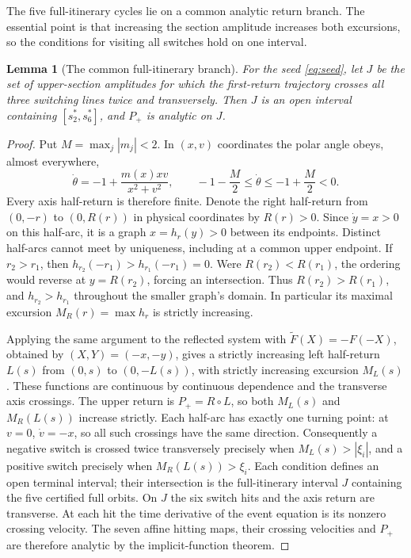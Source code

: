 \documentclass[11pt]{article}
\newtheorem{lemma}[theorem]{Lemma}
\theoremstyle{remark}
\begin{document}
The five full-itinerary cycles lie on a common analytic return branch.
The essential point is that increasing the section amplitude increases
both excursions, so the conditions for visiting all switches hold on
one interval.

\begin{lemma}[The common full-itinerary branch]\label{lem:common-branch}
For the seed \eqref{eq:seed}, let \(J\) be the set of upper-section
amplitudes for which the first-return trajectory crosses all three
switching lines twice and transversely.  Then \(J\) is an open interval
containing \([s_2^*,s_6^*]\), and \(P_+\) is analytic on \(J\).
\end{lemma}
\begin{proof}
Put \(M=\max_j|m_j|<2\).  In \((x,v)\) coordinates the polar angle
obeys, almost everywhere,
\[
 \dot\theta=-1+\frac{m(x)xv}{x^2+v^2},\qquad
 -1-\frac M2\le\dot\theta\le-1+\frac M2<0.
\]
Every axis half-return is therefore finite.  Denote the right
half-return from \((0,-r)\) to \((0,R(r))\) in physical coordinates
by \(R(r)>0\).  Since \(\dot y=x>0\) on this half-arc, it is a
graph \(x=h_r(y)>0\) between its endpoints.  Distinct half-arcs
cannot meet by uniqueness, including at a common upper endpoint.
If \(r_2>r_1\), then
\(h_{r_2}(-r_1)>h_{r_1}(-r_1)=0\).  Were
\(R(r_2)<R(r_1)\), the ordering would reverse at \(y=R(r_2)\),
forcing an intersection.  Thus \(R(r_2)>R(r_1)\), and
\(h_{r_2}>h_{r_1}\) throughout the smaller graph's domain.  In
particular its maximal excursion \(M_R(r)=\max h_r\) is strictly
increasing.

Applying the same argument to the reflected system with
\(\widetilde F(X)=-F(-X)\), obtained by \((X,Y)=(-x,-y)\), gives a
strictly increasing left half-return \(L(s)\) from \((0,s)\) to
\((0,-L(s))\), with strictly increasing excursion
\(M_L(s)\).  These functions are continuous by continuous dependence
and the transverse axis crossings.  The upper return is
\(P_+=R\circ L\), so both \(M_L(s)\) and \(M_R(L(s))\) increase
strictly.  Each half-arc has exactly one turning point: at \(v=0\),
\(\dot v=-x\), so all such crossings have the same direction.
Consequently a negative switch is crossed twice transversely precisely
when \(M_L(s)>|\xi_i|\), and a positive switch precisely when
\(M_R(L(s))>\xi_i\).  Each condition defines an open terminal
interval; their intersection is the full-itinerary interval \(J\)
containing the five certified full orbits.  On \(J\) the six switch
hits and the axis return are transverse.  At each hit the time
derivative of the event equation is its nonzero crossing velocity.
The seven affine hitting maps, their crossing velocities and \(P_+\)
are therefore analytic by the implicit-function theorem.
\end{proof}
\end{document}
